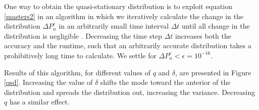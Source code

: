 One way to obtain the quasi-stationary distribution is to exploit equation \ref{masters2} in an algorithm in which we iteratively calculate the change in the distribution $\Delta P^c_n$ in an arbitrarily small time interval $\Delta t$ until all change in the distribution is negligible \cite{Nisbet1982}.
Decreasing the time step $\Delta t$ increases both the accuracy and the runtime, such that an arbitrarily accurate distribution takes a prohibitively long time to calculate.
We settle for $\Delta P^c_n<\epsilon = 10^{-16}$. %


Results of this algorithm, for different values of $q$ and $\delta$, are presented in Figure \ref{qsd}.
Increasing the value of $\delta$ shifts the mode toward the anterior of the distribution and spreads the distribution out, increasing the variance.
Decreasing $q$ has a similar effect. %
